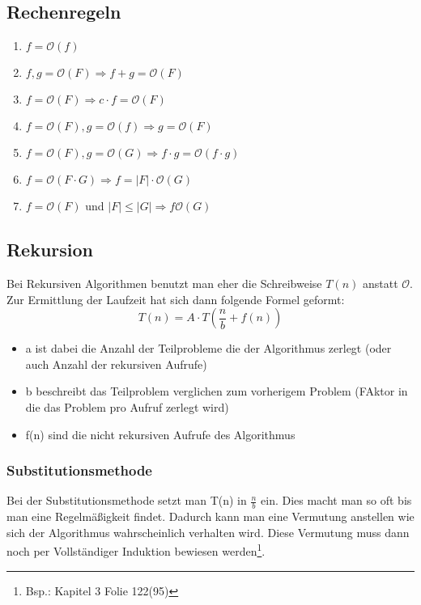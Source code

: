 \documentclass[a4paper]{scrartcl}
\begin{document}
        \subsection{Rechenregeln}
        \begin{enumerate}
            \item \(f = \mathcal{O}(f)\)
            \item \(f,g=\mathcal{O}(F) \Rightarrow f + g = \mathcal{O}(F)\)
            \item \(f=\mathcal{O}(F) \Rightarrow c \cdot f = \mathcal{O}(F)\)
            \item \(f = \mathcal{O}(F), g = \mathcal{O}(f) \Rightarrow g=\mathcal{O}(F)\)
            \item \(f = \mathcal{O}(F), g = \mathcal{O}(G) \Rightarrow f \cdot g = \mathcal{O}(f \cdot g)\)
            \item \(f = \mathcal{O}(F \cdot G) \Rightarrow f = |F| \cdot \mathcal{O}(G)\)
            \item \(f = \mathcal{O}(F)\) und \(|F| \le |G| \Rightarrow f \mathcal{O}(G)\)
        \end{enumerate}

        \subsection{Rekursion}
        Bei Rekursiven Algorithmen benutzt man eher die Schreibweise \(T(n)\) anstatt \(\mathcal{O}\). Zur Ermittlung der Laufzeit hat sich dann folgende Formel geformt: 
        \begin{equation}
            T(n) = A \cdot T( \frac{n}{b} + f(n))
        \end{equation} 
        \begin{itemize}
            \item a ist dabei die Anzahl der Teilprobleme die der Algorithmus zerlegt (oder auch Anzahl der rekursiven Aufrufe)
            \item b beschreibt das Teilproblem verglichen zum vorherigem Problem (FAktor in die das Problem pro Aufruf zerlegt wird)
            \item f(n) sind die nicht rekursiven Aufrufe des Algorithmus
        \end{itemize}
        
        \subsubsection*{Substitutionsmethode}
        Bei der Substitutionsmethode setzt man T(n) in \(\frac{n}{b}\) ein. Dies macht man so oft bis man eine Regelmäßigkeit findet. Dadurch kann man eine Vermutung anstellen wie 
        sich der Algorithmus wahrscheinlich verhalten wird. Diese Vermutung muss dann noch per Vollständiger Induktion bewiesen werden\footnote{Bsp.: Kapitel 3 Folie 122(95)}.
\end{document}

